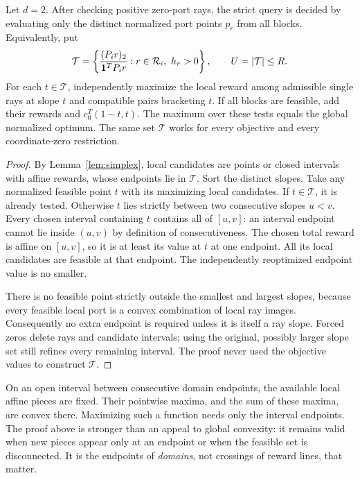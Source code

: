 \begin{theorem}
\label{thm:two}
Let $d=2$. After checking positive zero-port rays, the strict query is decided by evaluating only the distinct normalized port points $p_r$ from all blocks. Equivalently, put
\[
 \mathcal T=\left\{\frac{(P_i r)_2}{\one^TP_i r}:r\in\mathcal R_i,\ h_r>0\right\},\qquad U=|\mathcal T|\le R.
\]
For each $t\in\mathcal T$, independently maximize the local reward among admissible single rays at slope $t$ and compatible pairs bracketing $t$. If all blocks are feasible, add their rewards and $c_0^T(1-t,t)$. The maximum over these tests equals the global normalized optimum. The same set $\mathcal T$ works for every objective and every coordinate-zero restriction.
\end{theorem}
\begin{proof}
By Lemma~\ref{lem:simplex}, local candidates are points or closed intervals with affine rewards, whose endpoints lie in $\mathcal T$. Sort the distinct slopes. Take any normalized feasible point $t$ with its maximizing local candidates. If $t\in\mathcal T$, it is already tested. Otherwise $t$ lies strictly between two consecutive slopes $u<v$. Every chosen interval containing $t$ contains all of $[u,v]$: an interval endpoint cannot lie inside $(u,v)$ by definition of consecutiveness. The chosen total reward is affine on $[u,v]$, so it is at least its value at $t$ at one endpoint. All its local candidates are feasible at that endpoint. The independently reoptimized endpoint value is no smaller.

There is no feasible point strictly outside the smallest and largest slopes, because every feasible local port is a convex combination of local ray images. Consequently no extra endpoint is required unless it is itself a ray slope. Forced zeros delete rays and candidate intervals; using the original, possibly larger slope set still refines every remaining interval. The proof never used the objective values to construct $\mathcal T$.
\end{proof}

\begin{remark}
On an open interval between consecutive domain endpoints, the available local affine pieces are fixed. Their pointwise maxima, and the sum of these maxima, are convex there. Maximizing such a function needs only the interval endpoints. The proof above is stronger than an appeal to global convexity: it remains valid when new pieces appear only at an endpoint or when the feasible set is disconnected. It is the endpoints of \emph{domains}, not crossings of reward lines, that matter.
\end{remark}

